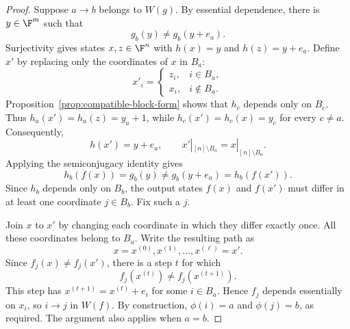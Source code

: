 \begin{proof}
    Suppose $a\to b$ belongs to $W(g)$. By essential dependence, there is $y\in\F^m$ such that
    \[
        g_b(y)\ne g_b(y+e_a).
    \]
    Surjectivity gives states $x,z\in\F^n$ with $h(x)=y$ and $h(z)=y+e_a$. Define $x'$ by replacing only the coordinates of $x$ in $B_a$:
    \[
        x'_i=\begin{cases}
            z_i,&i\in B_a,\\
            x_i,&i\notin B_a.
        \end{cases}
    \]
    Proposition~\ref{prop:compatible-block-form} shows that $h_c$ depends only on $B_c$. Thus $h_a(x')=h_a(z)=y_a+1$, while $h_c(x')=h_c(x)=y_c$ for every $c\ne a$. Consequently,
    \[
        h(x')=y+e_a,
        \qquad x'|_{[n]\setminus B_a}=x|_{[n]\setminus B_a}.
    \]
    Applying the semiconjugacy identity gives
    \[
        h_b(f(x))=g_b(y)\ne g_b(y+e_a)=h_b(f(x')).
    \]
    Since $h_b$ depends only on $B_b$, the output states $f(x)$ and $f(x')$ must differ in at least one coordinate $j\in B_b$. Fix such a $j$.

    Join $x$ to $x'$ by changing each coordinate in which they differ exactly once. All these coordinates belong to $B_a$. Write the resulting path as
    \[
        x=x^{(0)},x^{(1)},\dots,x^{(\ell)}=x'.
    \]
    Since $f_j(x)\ne f_j(x')$, there is a step $t$ for which
    \[
        f_j(x^{(t)})\ne f_j(x^{(t+1)}).
    \]
    This step has $x^{(t+1)}=x^{(t)}+e_i$ for some $i\in B_a$. Hence $f_j$ depends essentially on $x_i$, so $i\to j$ in $W(f)$. By construction, $\phi(i)=a$ and $\phi(j)=b$, as required. The argument also applies when $a=b$.
\end{proof}
